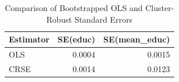 \begin{table}[ht]
\centering
\begin{tabular}{lrr}
  \hline
Estimator & SE(educ) & SE(mean\_educ) \\ 
  \hline
OLS & 0.0004 & 0.0015 \\ 
  CRSE & 0.0014 & 0.0123 \\ 
   \hline
\end{tabular}
\caption{Comparison of Bootstrapped OLS and Cluster-Robust Standard Errors} 
\label{tab:se_comparison_h}
\end{table}
